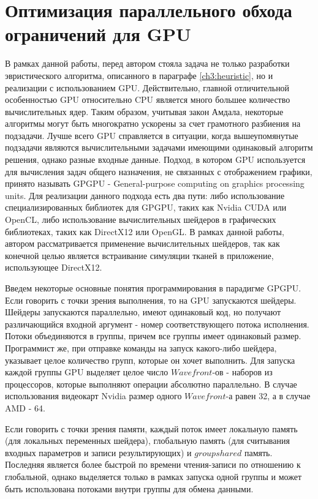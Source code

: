 \section{Оптимизация параллельного обхода ограничений для GPU} \label{ch3:chunks}
	В рамках данной работы, перед автором стояла задача не только разработки эвристического алгоритма, описанного в параграфе \ref{ch3:heuristic}, но и реализации с использованием GPU. Действительно, главной отличительной особенностью GPU относительно CPU является много большее количество вычислительных ядер. Таким образом, учитывая закон Амдала, некоторые алгоритмы могут быть многократно ускорены за счет грамотного разбиения на подзадачи. Лучше всего GPU справляется в ситуации, когда вышеупомянутые подзадачи являются вычислительными задачами имеющими одинаковый алгоритм решения, однако разные входные данные. Подход, в котором GPU используется для вычисления задач общего назначения, не связанных с отображением графики, принято называть GPGPU - General-purpose computing on graphics processing units. Для реализации данного подхода есть два пути: либо использование специализированных библиотек для GPGPU, таких как Nvidia CUDA или OpenCL, либо использование вычислительных шейдеров в графических библиотеках, таких как DirectX12 или OpenGL. В рамках данной работы, автором рассматривается применение вычислительных шейдеров, так как конечной целью является встраивание симуляции тканей в приложение, использующее DirectX12.
	
	Введем некоторые основные понятия программирования в парадигме GPGPU. Если говорить с точки зрения выполнения, то на GPU запускаются шейдеры. Шейдеры запускаются параллельно, имеют одинаковый код, но получают различающийся входной аргумент - номер соответствующего потока исполнения. Потоки объединяются в группы, причем все группы имеет одинаковый размер. Программист же, при отправке команды на запуск какого-либо шейдера, указывает целое количество групп, которые он хочет выполнить. Для запуска каждой группы GPU выделяет целое число $Wavefront$-ов - наборов из процессоров, которые выполняют операции абсолютно параллельно. В случае использования видеокарт Nvidia размер одного $Wavefront$-а равен 32, а в случае AMD - 64.
	
	Если говорить с точки зрения памяти, каждый поток имеет локальную память (для локальных переменных шейдера), глобальную память (для считывания входных параметров и записи результирующих) и $groupshared$ память. Последняя является более быстрой по времени чтения-записи по отношению к глобальной, однако выделяется только в рамках запуска одной группы и может быть использована потоками внутри группы для обмена данными.
	
